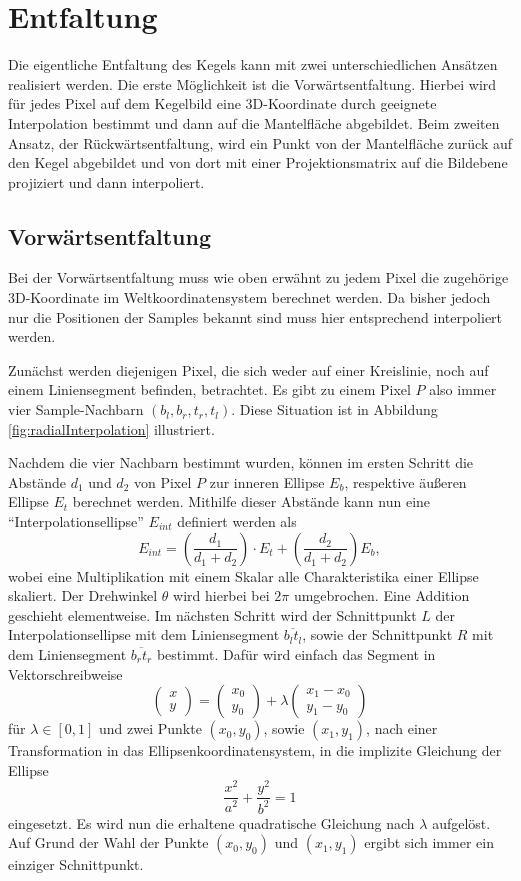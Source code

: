 \section{Entfaltung}
\label{s:unfolding}
Die eigentliche Entfaltung des Kegels kann mit zwei unterschiedlichen Ansätzen realisiert werden.
Die erste Möglichkeit ist die Vorwärtsentfaltung. Hierbei wird für jedes Pixel auf dem Kegelbild eine 3D-Koordinate durch geeignete Interpolation bestimmt und dann auf die Mantelfläche abgebildet. Beim zweiten Ansatz, der Rückwärtsentfaltung, wird ein Punkt von der Mantelfläche zurück auf den Kegel abgebildet und von dort mit einer Projektionsmatrix auf die Bildebene projiziert und dann interpoliert.

\subsection{Vorwärtsentfaltung}
Bei der Vorwärtsentfaltung muss wie oben erwähnt zu jedem Pixel die zugehörige 3D-Koordinate im Weltkoordinatensystem berechnet werden. Da bisher jedoch nur die Positionen der Samples bekannt sind muss hier entsprechend interpoliert werden.

Zunächst werden diejenigen Pixel, die sich weder auf einer Kreislinie, noch auf einem Liniensegment befinden, betrachtet. Es gibt zu einem Pixel $P$ also immer vier Sample-Nachbarn $(b_l, b_r, t_r, t_l)$. Diese Situation ist in Abbildung \ref{fig:radialInterpolation} illustriert.

Nachdem die vier Nachbarn bestimmt wurden, können im ersten Schritt die Abstände $d_1$ und $d_2$ von Pixel $P$ zur inneren Ellipse $E_b$, respektive äußeren Ellipse $E_t$ berechnet werden. Mithilfe dieser Abstände kann nun eine "`Interpolationsellipse"' $E_{int}$ definiert werden als
\[
	E_{int} = \left(\frac{d_1}{d_1 + d_2}\right) \cdot E_t + \left(\frac{d_2}{d_1 + d_2}\right) E_b,
\]
wobei eine Multiplikation mit einem Skalar alle Charakteristika einer Ellipse skaliert. Der Drehwinkel $\theta$ wird hierbei bei $2\pi$ umgebrochen. Eine Addition geschieht elementweise. Im nächsten Schritt wird der Schnittpunkt $L$ der Interpolationsellipse mit dem Liniensegment $\overline{b_lt_l}$, sowie der Schnittpunkt $R$ mit dem Liniensegment $\overline{b_rt_r}$ bestimmt. Dafür wird einfach das Segment in Vektorschreibweise
\[
\begin{pmatrix}
x \\ y
\end{pmatrix} = 
\begin{pmatrix}
x_0 \\ y_0
\end{pmatrix} + \lambda \begin{pmatrix}
x_1 - x_0 \\ y_1 - y_0
\end{pmatrix}
\] %
für $\lambda \in [0,1]$ und zwei Punkte $(x_0,y_0)$, sowie $(x_1,y_1)$, nach einer Transformation in das Ellipsenkoordinatensystem, in die implizite Gleichung der Ellipse
\[
\frac{x^2}{a^2} + \frac{y^2}{b^2} = 1
\] %
eingesetzt.
Es wird nun die erhaltene quadratische Gleichung nach $\lambda$ aufgelöst. Auf Grund der Wahl der Punkte $(x_0,y_0)$ und $(x_1,y_1)$ ergibt sich immer ein einziger Schnittpunkt.

